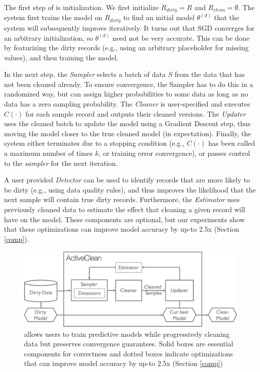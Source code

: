 The first step of \sys is initialization. We first initialize $R_{dirty} = R$ and $R_{clean} = \emptyset$.
The system first trains the model on $R_{dirty}$ to find an initial model $\theta^{(d)}$ that the system will subsequently improve iteratively.
It turns out that SGD converges for an arbitrary initialization, so $\theta^{(d)}$ need not be very accurate. 
This can be done by featurizing the dirty records (e.g., using an arbitrary placeholder for missing values), and then training the model.

In the next step, the {\it Sampler} selects a batch of data $S$ from the data that has not been cleaned already. To ensure convergence, the Sampler has to do this in a randomized way, but can assign higher probabilities to some data as long as no data has a zero sampling probability.
The {\it Cleaner} is user-specified and executes $C(\cdot)$ for each sample record and outputs their cleaned versions.
The {\it Updater} uses the cleaned batch to update the model using a Gradient Descent step, thus moving the model closer to the true cleaned model (in expectation).
Finally, the system either terminates due to a stopping condition (e.g., $C(\cdot)$ has been called a maximum number of times $k$, or training error convergence), or passes control to the {\it sampler} for the next iteration.

A user provided {\it Detector} can be used to identify records that are more likely to be dirty (e.g., using data quality rules), and thus improves the likelihood that the next sample will contain true dirty records. Furthermore, the {\it Estimator} uses previously cleaned data to estimate the effect that cleaning a given record will have on the model. These components are optional, but our experiments show that these optimizations can improve model accuracy by up-to 2.5x (Section \ref{comp}).

\begin{figure}[t]
\centering
 \includegraphics[width=0.8\columnwidth]{figs/arch.png}
 \caption{\sysfull allows users to train predictive models while progressively cleaning data but preserves convergence guarantees. Solid boxes are essential components for correctness and 
 dotted boxes indicate optimizations that can improve model accuracy by up-to 2.5x (Section \ref{comp}) \label{sys-arch}}
\end{figure}

